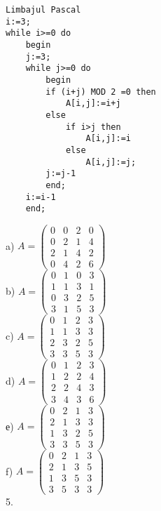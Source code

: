 \begin{verbatim}
Limbajul Pascal
i:=3;
while i>=0 do
    begin
    j:=3;
    while j>=0 do
        begin
        if (i+j) MOD 2 =0 then
            A[i,j]:=i+j
        else
            if i>j then
                A[i,j]:=i
            else
                A[i,j]:=j;
        j:=j-1
        end;
    i:=i-1
    end;
\end{verbatim}

a) $A=\left(\begin{array}{llll}0 & 0 & 2 & 0 \\ 0 & 2 & 1 & 4 \\ 2 & 1 & 4 & 2 \\ 0 & 4 & 2 & 6\end{array}\right)$\\
b) $A=\left(\begin{array}{llll}0 & 1 & 0 & 3 \\ 1 & 1 & 3 & 1 \\ 0 & 3 & 2 & 5 \\ 3 & 1 & 5 & 3\end{array}\right)$\\
c) $A=\left(\begin{array}{llll}0 & 1 & 2 & 3 \\ 1 & 1 & 3 & 3 \\ 2 & 3 & 2 & 5 \\ 3 & 3 & 5 & 3\end{array}\right)$\\
d) $A=\left(\begin{array}{llll}0 & 1 & 2 & 3 \\ 1 & 2 & 2 & 4 \\ 2 & 2 & 4 & 3 \\ 3 & 4 & 3 & 6\end{array}\right)$\\
е) $A=\left(\begin{array}{llll}0 & 2 & 1 & 3 \\ 2 & 1 & 3 & 3 \\ 1 & 3 & 2 & 5 \\ 3 & 3 & 5 & 3\end{array}\right)$\\
f) $A=\left(\begin{array}{llll}0 & 2 & 1 & 3 \\ 2 & 1 & 3 & 5 \\ 1 & 3 & 5 & 3 \\ 3 & 5 & 3 & 3\end{array}\right)$\\
5.

